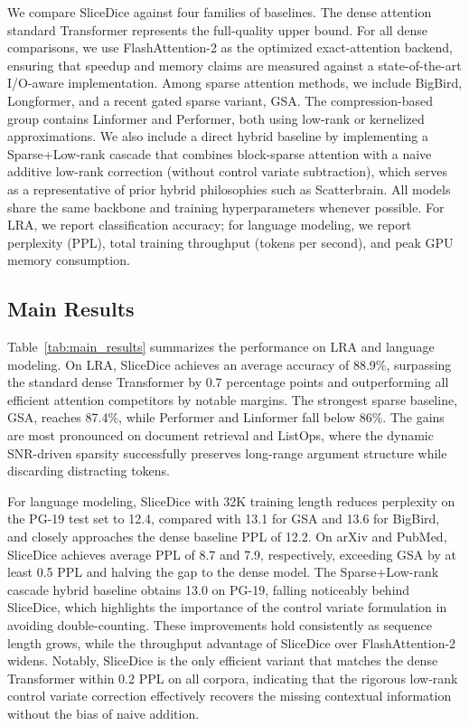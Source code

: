 \documentclass{article}
\begin{document}
We compare SliceDice against four families of baselines. The dense attention standard Transformer represents the full-quality upper bound. For all dense comparisons, we use FlashAttention-2 as the optimized exact-attention backend, ensuring that speedup and memory claims are measured against a state-of-the-art I/O-aware implementation. Among sparse attention methods, we include BigBird, Longformer, and a recent gated sparse variant, GSA. The compression-based group contains Linformer and Performer, both using low-rank or kernelized approximations. We also include a direct hybrid baseline by implementing a Sparse+Low-rank cascade that combines block-sparse attention with a naive additive low-rank correction (without control variate subtraction), which serves as a representative of prior hybrid philosophies such as Scatterbrain. All models share the same backbone and training hyperparameters whenever possible. For LRA, we report classification accuracy; for language modeling, we report perplexity (PPL), total training throughput (tokens per second), and peak GPU memory consumption.

\subsection{Main Results}

Table~\ref{tab:main_results} summarizes the performance on LRA and language modeling. On LRA, SliceDice achieves an average accuracy of 88.9\%, surpassing the standard dense Transformer by 0.7 percentage points and outperforming all efficient attention competitors by notable margins. The strongest sparse baseline, GSA, reaches 87.4\%, while Performer and Linformer fall below 86\%. The gains are most pronounced on document retrieval and ListOps, where the dynamic SNR-driven sparsity successfully preserves long-range argument structure while discarding distracting tokens.

For language modeling, SliceDice with 32K training length reduces perplexity on the PG-19 test set to 12.4, compared with 13.1 for GSA and 13.6 for BigBird, and closely approaches the dense baseline PPL of 12.2. On arXiv and PubMed, SliceDice achieves average PPL of 8.7 and 7.9, respectively, exceeding GSA by at least 0.5 PPL and halving the gap to the dense model. The Sparse+Low-rank cascade hybrid baseline obtains 13.0 on PG-19, falling noticeably behind SliceDice, which highlights the importance of the control variate formulation in avoiding double-counting. These improvements hold consistently as sequence length grows, while the throughput advantage of SliceDice over FlashAttention-2 widens. Notably, SliceDice is the only efficient variant that matches the dense Transformer within 0.2 PPL on all corpora, indicating that the rigorous low-rank control variate correction effectively recovers the missing contextual information without the bias of naive addition.
\end{document}
